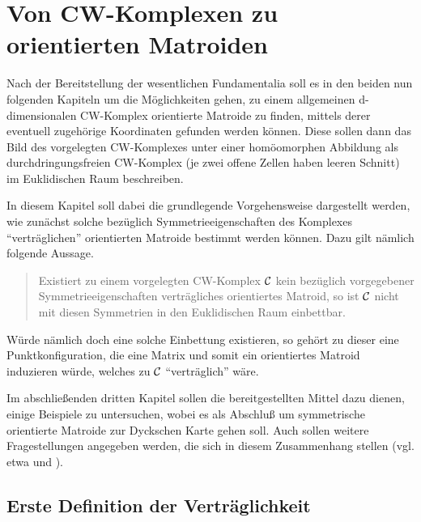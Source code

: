 \chapter{Von CW-Komplexen zu orientierten Matroiden}

Nach der Bereitstellung der wesentlichen Fundamentalia soll es in den beiden
nun folgenden Kapiteln um die Möglichkeiten gehen, zu einem allgemeinen
d-dimensionalen CW-Komplex orientierte Matroide zu finden, mittels derer
eventuell zugehörige Koordinaten gefunden werden können. Diese sollen dann
das Bild des vorgelegten CW-Komplexes unter einer ho\-möo\-mor\-phen
Abbildung als durchdringungsfreien CW-Komplex (je zwei offene Zellen haben
leeren Schnitt) im Euklidischen Raum beschreiben.

In diesem Kapitel soll dabei die grundlegende Vorgehensweise dargestellt
werden, wie zunächst solche bezüglich Symmetrieeigenschaften des Komplexes
"`verträglichen"' orientierten Matroide bestimmt werden können. Dazu gilt
nämlich folgende Aussage.
\begin{quote}
{\sf
Existiert zu einem vorgelegten CW-Komplex ${\cal C}$ kein bezüglich vorgegebener
Symmetrieeigenschaften verträgliches orientiertes Matroid, so ist ${\cal C}$ nicht
mit diesen Symmetrien in den Euklidischen Raum einbettbar.
}
\end{quote}
Würde nämlich doch eine solche Einbettung existieren, so gehört zu dieser
eine Punktkonfiguration, die eine Matrix und somit ein orientiertes Matroid
induzieren würde, welches zu ${\cal C}$ "`verträglich"' wäre.

Im abschließenden dritten Kapitel sollen die bereitgestellten Mittel dazu
dienen, einige Beispiele zu untersuchen, wobei es als Abschluß um symmetrische
orientierte Matroide zur Dyckschen Karte gehen soll. Auch sollen weitere
Fragestellungen angegeben werden, die sich in diesem Zusammenhang stellen
(vgl. etwa \cite{Bo:86} und \cite{Bo:91}).

\section{Erste Definition der Verträglichkeit}

